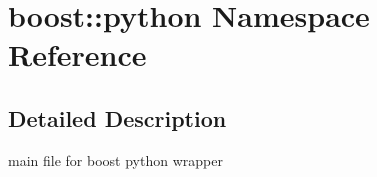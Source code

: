 \section{boost::python Namespace Reference}
\label{namespaceboost_1_1python}




\subsection{Detailed Description}
main file for boost python wrapper 

